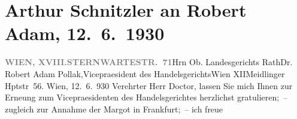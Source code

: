 

         
         \renewcommand{\erwaehntePersonen}{Personen: Robert Adam}
         \renewcommand{\erwaehnteInstitutionen}{Institutionen: Handelsgericht Wien}
         \renewcommand{\erwaehnteOrte}{Orte: Frankfurt am Main, Meidlinger Hauptstraße, Sternwartestraße, Wien, XII., Meidling, XVIII., Währing}
         \renewcommand{\erwaehnteWerke}{Werke: Margot und das Jugendgericht}
               \section[Arthur Schnitzler an Robert Adam, 12. 6. 1930]{ Arthur Schnitzler an Robert Adam, 12. 6. 1930}\nopagebreak{}\rehead{ }\begin{ledgroupsized}[t]{13cm}\normalsize\beginnumbering \toendnotes[C]{\smallbreak\pagebreak[2]} 
\toendnotes[C]{\smallbreak}\pstart{}{\pb}\label{T_L02536-1v}\label{T_L02536-1h}\pend{}\pstart{}\textcolor{gray}{\textbf{WIEN, XVIII.}}\pend{}\pstart{}\textcolor{gray}{\textbf{STERNWARTESTR. 71}}\pend{}{\bigskip}\pstart{}{\pb}Hrn Ob. Landesgerichts
                        Rath\pend{}\pstart{}Dr. Robert Adam Pollak,\pend{}\pstart{}Vicepraesident des Handelsgerichts\pend{}\pstart{}Wien XII\pend{}\pstart{}Meidlinger Hptstr 56.\pend{}{\bigskip}\pstart
           \raggedleft{}{\pb}Wien, 12. 6. 930\pend
           \pstart{}Verehrter Herr Doctor,\pend\pstart
           lassen Sie mich Ihnen zur Erne{\geminationn}ung zum
                    Vicepraesidenten des Handelsgerichtes
                    herzlichst gratulieren; – zugleich zur Annahme der Margot in Frankfurt; – ich freue

\end{ledgroupsized}
